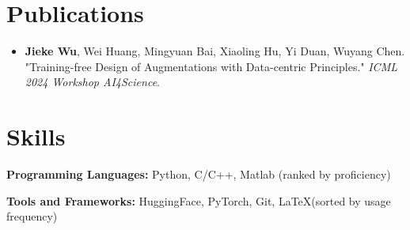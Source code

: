 \documentclass{resume}
\begin{document}
\section{Publications}
\begin{itemize}
  \item \textbf{Jieke Wu}, Wei Huang, Mingyuan Bai, Xiaoling Hu, Yi Duan, Wuyang Chen. "Training-free Design of Augmentations with Data-centric Principles." \emph{ICML 2024 Workshop AI4Science}.
\end{itemize}

\section{Skills}
  \textbf{Programming Languages:} \small Python, C/C++, Matlab (ranked by proficiency)

  \textbf{Tools and Frameworks:} \small HuggingFace, PyTorch, Git, \LaTeX (sorted by usage frequency) 
\end{document}
